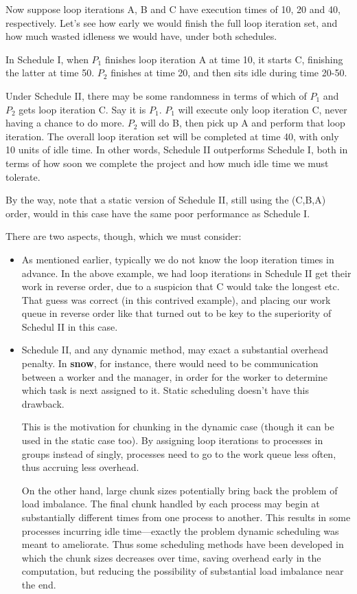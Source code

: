 Now suppose loop iterations A, B and C have execution times of 10, 20
and 40, respectively.  Let's see how early we would finish the full loop
iteration set, and how much wasted idleness we would have, under both
schedules.

In Schedule I, when $P_1$ finishes loop iteration A at time 10, it starts C,
finishing the latter at time 50.  $P_2$ finishes at time 20, and then sits
idle during time 20-50.

Under Schedule II, there may be some randomness in terms of which of
$P_1$ and $P_2$ gets loop iteration C.  Say it is $P_1$.  $P_1$ will
execute only loop iteration C, never having a chance to do more.  $P_2$
will do B, then pick up A and perform that loop iteration.  The overall
loop iteration set will be completed at time 40, with only 10 units of
idle time.  In other words, Schedule II outperforms Schedule I, both in
terms of how soon we complete the project and how much idle time we must
tolerate.

By the way, note that a static version of Schedule II, still using the
(C,B,A) order, would in this case have the same poor performance as
Schedule I.

There are two aspects, though, which we must consider:

\begin{itemize}

\item As mentioned earlier, typically we do not know the loop iteration
times in advance.  In the above example, we had loop iterations in
Schedule II get their work in reverse order, due to a suspicion that C
would take the longest etc.  That guess was correct (in this contrived
example), and placing our work queue in reverse order like that turned
out to be key to the superiority of Schedul II in this case.

\item Schedule II, and any dynamic method, may exact a substantial
overhead penalty.  In {\bf snow}, for instance, there would need to be
communication between a worker and the manager, in order for the worker
to determine which task is next assigned to it.  Static scheduling
doesn't have this drawback.

This is the motivation for chunking in the dynamic case (though it can
be used in the static case too).  By assigning loop iterations to
processes in groups instead of singly, processes need to go to the work
queue less often, thus accruing less overhead.

On the other hand, large chunk sizes potentially bring back the problem
of load imbalance.  The final chunk handled by each process may begin at
substantially different times from one process to another.  This results
in some processes incurring idle time---exactly the problem dynamic
scheduling was meant to ameliorate.  Thus some scheduling methods have been
developed in which the chunk sizes decreases over time, saving overhead
early in the computation, but reducing the possibility of substantial
load imbalance near the end.

\end{itemize}

